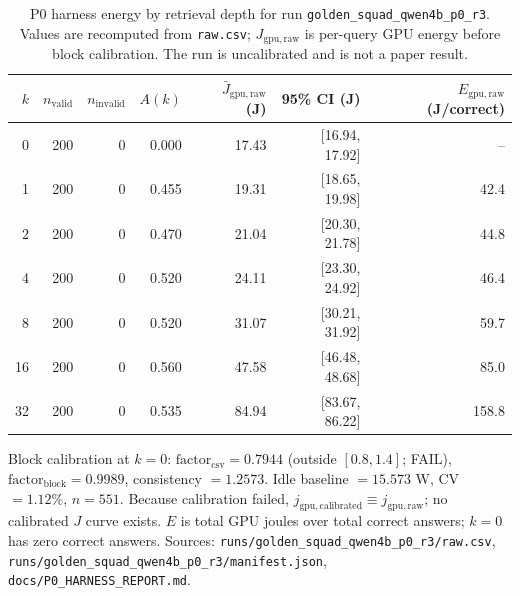 \begin{table}[t]
\centering
\caption{P0 harness energy by retrieval depth for run \texttt{golden\_squad\_qwen4b\_p0\_r3}. Values are recomputed from \texttt{raw.csv}; $J_{\mathrm{gpu,raw}}$ is per-query GPU energy before block calibration. The run is uncalibrated and is not a paper result.}
\label{tab:p0_harness}
\small
\setlength{\tabcolsep}{4pt}
\begin{tabular}{rrrrrrr}
\toprule
$k$ & $n_{\mathrm{valid}}$ & $n_{\mathrm{invalid}}$ & $A(k)$ & $\bar{J}_{\mathrm{gpu,raw}}$ (J) & 95\% CI (J) & $E_{\mathrm{gpu,raw}}$ (J/correct) \\
\midrule
0 & 200 & 0 & 0.000 & 17.43 & [16.94, 17.92] & -- \\
1 & 200 & 0 & 0.455 & 19.31 & [18.65, 19.98] & 42.4 \\
2 & 200 & 0 & 0.470 & 21.04 & [20.30, 21.78] & 44.8 \\
4 & 200 & 0 & 0.520 & 24.11 & [23.30, 24.92] & 46.4 \\
8 & 200 & 0 & 0.520 & 31.07 & [30.21, 31.92] & 59.7 \\
16 & 200 & 0 & 0.560 & 47.58 & [46.48, 48.68] & 85.0 \\
32 & 200 & 0 & 0.535 & 84.94 & [83.67, 86.22] & 158.8 \\
\bottomrule
\end{tabular}
\par\vspace{2pt}
\begin{flushleft}
\footnotesize
Block calibration at $k=0$: $\mathrm{factor}_{\mathrm{csv}}=0.7944$ (outside $[0.8,1.4]$; FAIL), $\mathrm{factor}_{\mathrm{block}}=0.9989$, consistency $=1.2573$. Idle baseline $=15.573$ W, CV $=1.12\%$, $n=551$. Because calibration failed, $j_{\mathrm{gpu,calibrated}}\equiv j_{\mathrm{gpu,raw}}$; no calibrated $J$ curve exists. $E$ is total GPU joules over total correct answers; $k=0$ has zero correct answers. Sources: \texttt{runs/golden\_squad\_qwen4b\_p0\_r3/raw.csv}, \texttt{runs/golden\_squad\_qwen4b\_p0\_r3/manifest.json}, \texttt{docs/P0\_HARNESS\_REPORT.md}.
\end{flushleft}
\end{table}
